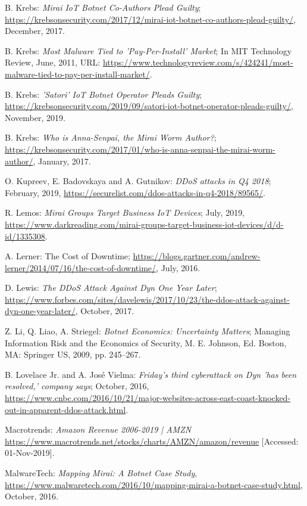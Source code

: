 \begin{thebibliography}{99}
 B. Krebs: \emph{Mirai IoT Botnet Co-Authors Plead Guilty}; \url{https://krebsonsecurity.com/2017/12/mirai-iot-botnet-co-authors-plead-guilty/}, December, 2017.

 B. Krebs: \emph{Most Malware Tied to 'Pay-Per-Install' Market}; In MIT Technology Review, June, 2011, URL: \url{https://www.technologyreview.com/s/424241/most-malware-tied-to-pay-per-install-market/}.

 B. Krebs: \emph{'Satori' IoT Botnet Operator Pleads Guilty}; \url{https://krebsonsecurity.com/2019/09/satori-iot-botnet-operator-pleads-guilty/}, November, 2019.

 B. Krebs: \emph{Who is Anna-Senpai, the Mirai Worm Author?}; \url{https://krebsonsecurity.com/2017/01/who-is-anna-senpai-the-mirai-worm-author/}, January, 2017.

 O. Kupreev, E. Badovskaya and A. Gutnikov: \emph{DDoS attacks in Q4 2018}; February, 2019, \url{https://securelist.com/ddos-attacks-in-q4-2018/89565/}.

 R. Lemos: \emph{Mirai Groups Target Business IoT Devices}; July, 2019, \url{https://www.darkreading.com/mirai-groups-target-business-iot-devices/d/d-id/1335308}.

 A. Lerner: The Cost of Downtime; \url{https://blogs.gartner.com/andrew-lerner/2014/07/16/the-cost-of-downtime/}, July, 2016.

 D. Lewis: \emph{The DDoS Attack Against Dyn One Year Later}; \url{https://www.forbes.com/sites/davelewis/2017/10/23/the-ddos-attack-against-dyn-one-year-later/}, October, 2017.

 Z. Li, Q. Liao, A. Striegel:  \emph{Botnet Economics: Uncertainty Matters}; Managing Information Risk and the Economics of Security, M. E. Johnson, Ed. Boston, MA: Springer US, 2009, pp. 245--267.

 B. Lovelace Jr. and A. José Vielma: \emph{Friday's third cyberattack on Dyn 'has been resolved,' company says}; October, 2016, \url{https://www.cnbc.com/2016/10/21/major-websites-across-east-coast-knocked-out-in-apparent-ddos-attack.html}.

 Macrotrends: \emph{Amazon Revenue 2006-2019 | AMZN} \url{https://www.macrotrends.net/stocks/charts/AMZN/amazon/revenue} [Accessed: 01-Nov-2019].

 MalwareTech: \emph{Mapping Mirai: A Botnet Case Study}, \url{https://www.malwaretech.com/2016/10/mapping-mirai-a-botnet-case-study.html}, October, 2016.


\end{thebibliography}

